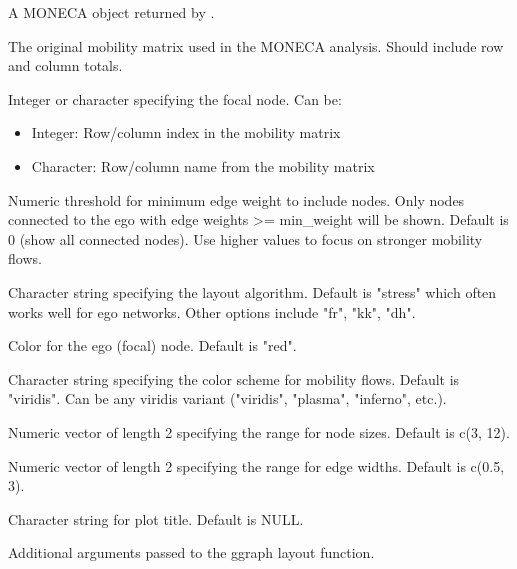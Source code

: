 \documentclass[a4paper]{book}
\begin{document}
\begin{Arguments}
\begin{ldescription}
\item[\code{segments}] A MONECA object returned by .

\item[\code{mobility\_matrix}] The original mobility matrix used in the MONECA analysis.
Should include row and column totals.

\item[\code{ego\_id}] Integer or character specifying the focal node. Can be:
\begin{itemize}

\item{} Integer: Row/column index in the mobility matrix
\item{} Character: Row/column name from the mobility matrix

\end{itemize}


\item[\code{min\_weight}] Numeric threshold for minimum edge weight to include nodes.
Only nodes connected to the ego with edge weights >= min\_weight will be shown.
Default is 0 (show all connected nodes). Use higher values to focus on 
stronger mobility flows.

\item[\code{layout}] Character string specifying the layout algorithm. Default is "stress"
which often works well for ego networks. Other options include "fr", "kk", "dh".

\item[\code{highlight\_color}] Color for the ego (focal) node. Default is "red".

\item[\code{flow\_color}] Character string specifying the color scheme for mobility flows.
Default is "viridis". Can be any viridis variant ("viridis", "plasma", "inferno", etc.).

\item[\code{node\_size\_range}] Numeric vector of length 2 specifying the range for node sizes.
Default is c(3, 12).

\item[\code{edge\_width\_range}] Numeric vector of length 2 specifying the range for edge widths.
Default is c(0.5, 3).

\item[\code{title}] Character string for plot title. Default is NULL.

\item[\code{...}] Additional arguments passed to the ggraph layout function.
\end{ldescription}
\end{Arguments}
\end{document}
